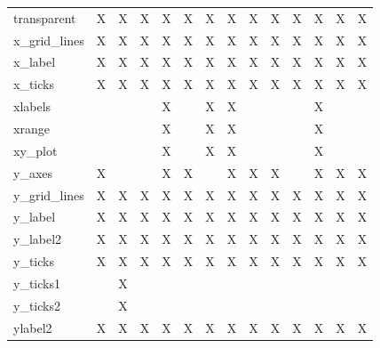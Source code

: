 {\begin{table}
\begin{tabular}{|l|c|c|c|c|c|c|c|c|c|c|c|c|c|}
transparent            & X & X & X & X & X & X & X & X & X & X & X & X & X \\
x\_grid\_lines         & X & X & X & X & X & X & X & X & X & X & X & X & X \\
x\_label               & X & X & X & X & X & X & X & X & X & X & X & X & X \\
x\_ticks               & X & X & X & X & X & X & X & X & X & X & X & X & X \\
xlabels                &   &   &   & X &   & X & X &   &   &   & X &   &   \\
xrange                 &   &   &   & X &   & X & X &   &   &   & X &   &   \\
xy\_plot               &   &   &   & X &   & X & X &   &   &   & X &   &   \\
y\_axes                & X &   &   & X & X &   & X & X & X &   & X & X & X \\
y\_grid\_lines         & X & X & X & X & X & X & X & X & X & X & X & X & X \\
y\_label               & X & X & X & X & X & X & X & X & X & X & X & X & X \\
y\_label2              & X & X & X & X & X & X & X & X & X & X & X & X & X \\
y\_ticks               & X & X & X & X & X & X & X & X & X & X & X & X & X \\
y\_ticks1              &   & X &   &   &   &   &   &   &   &   &   &   &   \\
y\_ticks2              &   & X &   &   &   &   &   &   &   &   &   &   &   \\
ylabel2                & X & X & X & X & X & X & X & X & X & X & X & X & X \\
\hline
\end{tabular}
\end{table}
}

